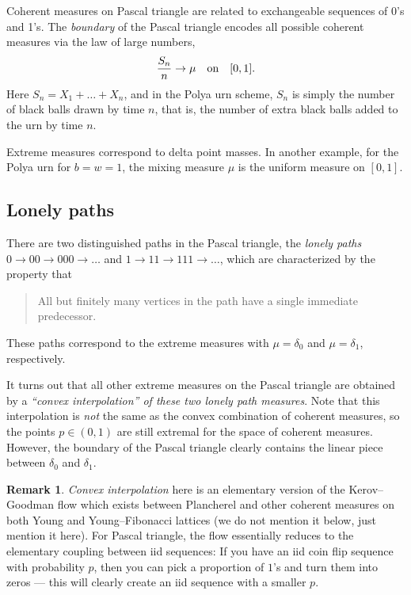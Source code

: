 \documentclass[letterpaper,11pt,oneside,reqno]{article}
\numberwithin{equation}{section}
\theoremstyle{definition}
\newtheorem{remark}[proposition]{Remark}
\begin{document}
Coherent measures on Pascal triangle are related to exchangeable
sequences of 0's and 1's. The \emph{boundary} of the Pascal
triangle encodes all possible coherent measures via the law of large numbers,
\begin{equation*}
	\frac{S_n}{n}\to \mu \quad \textnormal{on} \quad [0,1].
\end{equation*}
Here
$S_n=X_1+\ldots+X_n$,
and in the Polya urn scheme,
$S_n$ is simply the
number of black balls drawn by time $n$,
that is, the number of extra black balls added to the urn
by time $n$.

Extreme measures correspond to delta point masses.
In another example, for the Polya urn for $b=w=1$, the mixing measure $\mu$ is the
uniform measure on $[0,1]$.

\subsection{Lonely paths}

There are two distinguished paths in the Pascal triangle, the
\emph{lonely paths} $0\to00\to000\to\ldots $
and
$1\to 11\to111\to\ldots $, which are characterized by the
property that \cite{KerovGoodman1997}
\begin{quote}
	All but finitely many vertices in the path have a single immediate predecessor.
\end{quote}
These paths correspond to the extreme measures
with $\mu=\delta_0$ and $\mu=\delta_1$, respectively.

It turns out that all other extreme measures on the Pascal triangle
are obtained by a \emph{``convex interpolation'' of these two lonely path measures}.
Note that this interpolation is \emph{not} the same as the convex combination
of coherent measures, so the points $p\in(0,1)$ are still extremal
for the space of coherent measures. However, the boundary
of the Pascal triangle clearly contains the linear
piece between $\delta_0$ and $\delta_1$.

\begin{remark}
	\emph{Convex interpolation} here is an elementary version of the
	Kerov--Goodman flow \cite{KerovGoodman1997}
	which exists between Plancherel and other coherent measures on both
	Young and Young--Fibonacci lattices (we do not mention it below, just mention it here).
	For Pascal triangle, the flow essentially reduces to the elementary coupling between iid sequences:
	If you have an iid coin flip sequence with probability $p$, then you can pick a proportion of $1$'s and turn them
	into zeros --- this will clearly create an iid sequence with a smaller $p$.
\end{remark}
\end{document}

